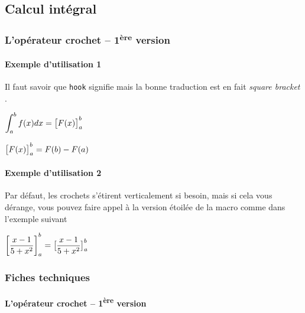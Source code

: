 \documentclass[12pt,a4paper]{article}
\newcommand\dd[1]{d#1}
\begin{document}

\subsection{Calcul intégral}

\subsubsection{L'opérateur crochet -- 1\textsuperscript{ère} version}

\paragraph{Exemple d'utilisation 1}

Il faut savoir que \verb+hook+ signifie  mais la bonne traduction est en fait \emph{\og square bracket \fg}.
\begin{latexex}
$\displaystyle
 \int_{a}^{b} f(x) \dd{x}
 = \hook{F(x)}{a}{b}$

$\hook{F(x)}{a}{b}
 = F(b) - F(a)$
\end{latexex}




\paragraph{Exemple d'utilisation 2}

Par défaut, les crochets s'étirent verticalement si besoin, mais si cela vous dérange, vous pouvez faire appel à la version étoilée de la macro comme dans l'exemple suivant

\begin{latexex}
$\displaystyle
 \hook{\frac{x - 1}{5 + x^2}}{a}{b}
 = \hook*{\frac{x - 1}{5 + x^2}}{a}{b}$
\end{latexex}




\subsubsection{Fiches techniques}

\paragraph{L'opérateur crochet -- 1\textsuperscript{ère} version}
\end{document}
